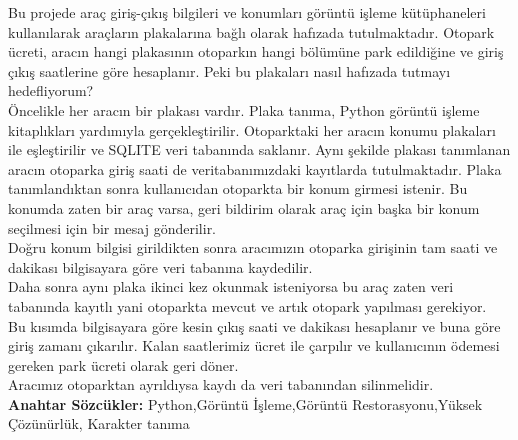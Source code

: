 Bu projede araç giriş-çıkış bilgileri ve konumları görüntü işleme kütüphaneleri kullanılarak araçların plakalarına bağlı olarak hafızada tutulmaktadır. Otopark ücreti, aracın hangi plakasının otoparkın hangi bölümüne park edildiğine ve giriş çıkış saatlerine göre hesaplanır.
Peki bu plakaları nasıl hafızada tutmayı hedefliyorum? \\
Öncelikle her aracın bir plakası vardır. Plaka tanıma, Python görüntü işleme kitaplıkları yardımıyla gerçekleştirilir. Otoparktaki her aracın konumu plakaları ile eşleştirilir ve SQLITE veri tabanında saklanır. Aynı şekilde plakası tanımlanan aracın otoparka giriş saati de veritabanımızdaki kayıtlarda tutulmaktadır.
Plaka tanımlandıktan sonra kullanıcıdan otoparkta bir konum girmesi istenir. Bu konumda zaten bir araç varsa, geri bildirim olarak araç için başka bir konum seçilmesi için bir mesaj gönderilir. \\
Doğru konum bilgisi girildikten sonra aracımızın otoparka girişinin tam saati ve dakikası bilgisayara göre veri tabanına kaydedilir. \\
Daha sonra aynı plaka ikinci kez okunmak isteniyorsa bu araç zaten veri tabanında kayıtlı yani otoparkta mevcut ve artık otopark yapılması gerekiyor.\\
Bu kısımda bilgisayara göre kesin çıkış saati ve dakikası hesaplanır ve buna göre giriş zamanı çıkarılır. Kalan saatlerimiz ücret ile çarpılır ve kullanıcının ödemesi gereken park ücreti olarak geri döner. \\
Aracımız otoparktan ayrıldıysa kaydı da veri tabanından silinmelidir. \\

\textbf{Anahtar Sözcükler:} Python,Görüntü İşleme,Görüntü Restorasyonu,Yüksek Çözünürlük, Karakter tanıma